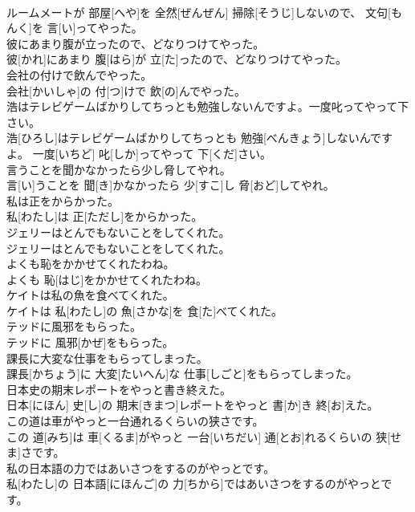\documentclass[8pt]{extreport}
\begin{document}
\begin{CJK}{UTF8}{min}
\\	ルームメートが 部屋[へや]を 全然[ぜんぜん] 掃除[そうじ]しないので、 文句[もんく]を 言[い]ってやった。
\\	彼にあまり腹が立ったので、どなりつけてやった。	
\\	彼[かれ]にあまり 腹[はら]が 立[た]ったので、どなりつけてやった。
\\	会社の付けで飲んでやった。	
\\	会社[かいしゃ]の 付[つ]けで 飲[の]んでやった。
\\	浩はテレビゲームばかりしてちっとも勉強しないんですよ。一度叱ってやって下さい。	
\\	浩[ひろし]はテレビゲームばかりしてちっとも 勉強[べんきょう]しないんですよ。 一度[いちど] 叱[しか]ってやって 下[くだ]さい。
\\	言うことを聞かなかったら少し脅してやれ。	
\\	言[い]うことを 聞[き]かなかったら 少[すこ]し 脅[おど]してやれ。
\\	私は正をからかった。	
\\	私[わたし]は 正[ただし]をからかった。
\\	ジェリーはとんでもないことをしてくれた。	
\\	ジェリーはとんでもないことをしてくれた。
\\	よくも恥をかかせてくれたわね。	
\\	よくも 恥[はじ]をかかせてくれたわね。
\\	ケイトは私の魚を食べてくれた。	
\\	ケイトは 私[わたし]の 魚[さかな]を 食[た]べてくれた。
\\	テッドに風邪をもらった。	
\\	テッドに 風邪[かぜ]をもらった。
\\	課長に大変な仕事をもらってしまった。	
\\	課長[かちょう]に 大変[たいへん]な 仕事[しごと]をもらってしまった。
\\	日本史の期末レポートをやっと書き終えた。	
\\	日本[にほん] 史[し]の 期末[きまつ]レポートをやっと 書[か]き 終[お]えた。
\\	この道は車がやっと一台通れるくらいの狭さです。	
\\	この 道[みち]は 車[くるま]がやっと 一台[いちだい] 通[とお]れるくらいの 狭[せま]さです。
\\	私の日本語の力ではあいさつをするのがやっとです。	
\\	私[わたし]の 日本語[にほんご]の 力[ちから]ではあいさつをするのがやっとです。

\end{CJK}
\end{document}

